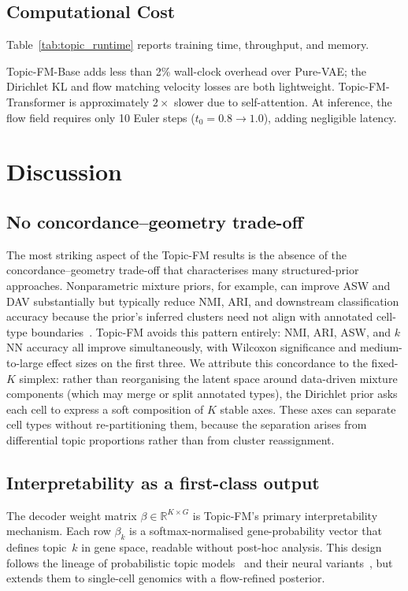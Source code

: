 \documentclass[biology,article,submit,pdftex,moreauthors]{Definitions/mdpi}
\begin{document}
\subsection{Computational Cost}
Table~\ref{tab:topic_runtime} reports training time, throughput, and memory.



Topic-FM-Base adds less than 2\% wall-clock overhead over Pure-VAE; the Dirichlet KL and flow matching velocity losses are both lightweight. Topic-FM-Transformer is approximately $2\times$ slower due to self-attention. At inference, the flow field requires only 10 Euler steps ($t_0{=}0.8 \to 1.0$), adding negligible latency.

\section{Discussion}\label{sec:discussion}

\subsection{No concordance--geometry trade-off}
The most striking aspect of the Topic-FM results is the absence of the concordance--geometry trade-off that characterises many structured-prior approaches. Nonparametric mixture priors, for example, can improve ASW and DAV substantially but typically reduce NMI, ARI, and downstream classification accuracy because the prior's inferred clusters need not align with annotated cell-type boundaries~\cite{li2023scdac}. Topic-FM avoids this pattern entirely: NMI, ARI, ASW, and $k$NN accuracy all improve simultaneously, with Wilcoxon significance and medium-to-large effect sizes on the first three. We attribute this concordance to the fixed-$K$ simplex: rather than reorganising the latent space around data-driven mixture components (which may merge or split annotated types), the Dirichlet prior asks each cell to express a soft composition of $K$ stable axes. These axes can separate cell types without re-partitioning them, because the separation arises from differential topic proportions rather than from cluster reassignment.

\subsection{Interpretability as a first-class output}
The decoder weight matrix $\beta \in \mathbb{R}^{K \times G}$ is Topic-FM's primary interpretability mechanism. Each row $\beta_k$ is a softmax-normalised gene-probability vector that defines topic~$k$ in gene space, readable without post-hoc analysis. This design follows the lineage of probabilistic topic models~\cite{blei2003latent} and their neural variants~\cite{srivastava2017autoencoding,miao2016neural}, but extends them to single-cell genomics with a flow-refined posterior.
\end{document}
